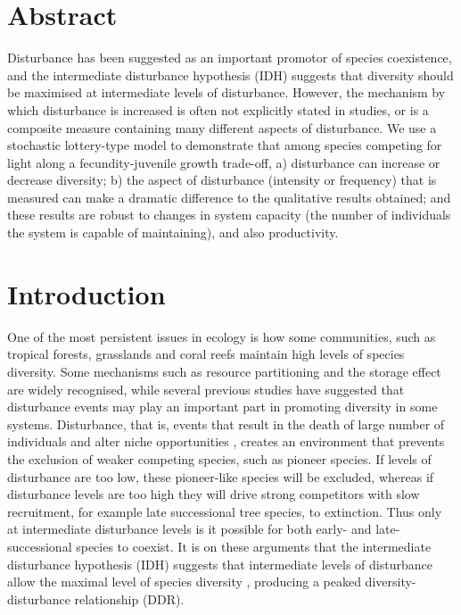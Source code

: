 \newpage
{}
\vspace*{\fill}
\section*{Abstract}
Disturbance has been suggested as an important promotor of species coexistence, and the intermediate disturbance hypothesis (IDH) suggests that diversity should be maximised at intermediate levels of disturbance. However, the mechanism by which disturbance is increased is often not explicitly stated in studies, or is a composite measure containing many different aspects of disturbance. We use a stochastic lottery-type model to demonstrate that among species competing for light along a fecundity-juvenile growth trade-off, a) disturbance can increase or decrease diversity;  b) the aspect of disturbance (intensity or frequency) that is measured can make a dramatic difference to the qualitative results obtained; and these results are robust to changes in system capacity (the number of individuals the system is capable of maintaining), and also productivity.
\vspace*{\fill}
\newpage
\section{Introduction}
\label{intro}
One of the most persistent issues in ecology is how some communities, such as tropical forests, grasslands and coral reefs maintain high levels of species diversity. Some mechanisms such as resource partitioning \citep[e.g.][]{sala1989resource,schoener1974resource} and the storage effect \citep{warner1985coexistence} are widely recognised, while several previous studies \citep[e.g.][]{denslow1987tropical,sousa1984role} have suggested that disturbance events may play an important part in promoting diversity in some systems. Disturbance, that is, events that result in the death of large number of individuals and alter niche opportunities \citep{shea2004moving}, creates an environment that prevents the exclusion of weaker competing species, such as pioneer species. If levels of disturbance are too low, these pioneer-like species will be excluded, whereas if disturbance levels are too high they will drive strong competitors with slow recruitment, for example late successional tree species, to extinction. Thus only at intermediate disturbance levels is it possible for both early- and late- successional species to coexist. It is on these arguments that the intermediate disturbance hypothesis (IDH) suggests that intermediate levels of disturbance allow the maximal level of species diversity \citep[e.g.][]{connell1978diversity,huston1979general}, producing a peaked diversity-disturbance relationship (DDR).

